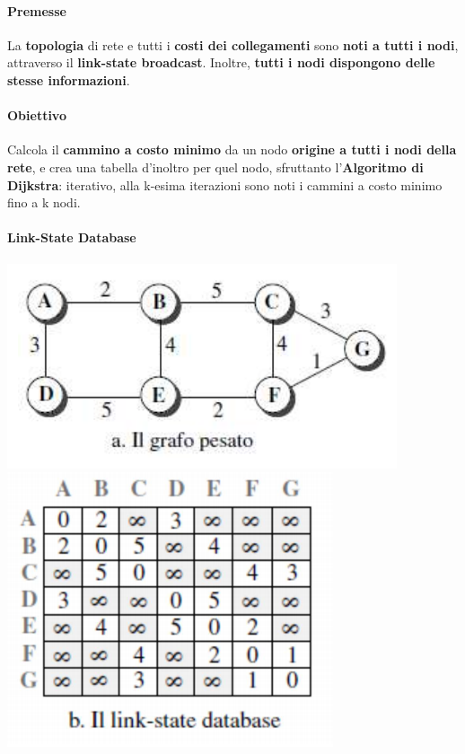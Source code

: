 \documentclass[10pt]{article}
\begin{document}
\paragraph{Premesse} La \textbf{topologia} di rete e tutti i \textbf{costi dei collegamenti} sono \textbf{noti a tutti i nodi}, attraverso il \textbf{link-state broadcast}. Inoltre, \textbf{tutti i nodi dispongono delle stesse informazioni}.
\paragraph{Obiettivo} Calcola il \textbf{cammino a costo minimo} da un nodo \textbf{origine a tutti i nodi della rete}, e crea una tabella d'inoltro per quel nodo, sfruttanto l'\textbf{Algoritmo di Dijkstra}: iterativo, alla k-esima iterazioni sono noti i cammini a costo minimo fino a k nodi.
\paragraph{Link-State Database}
\begin{center}
	\begin{multicols}{2}
		\includegraphics[scale=0.7]{linkstategraph.png}\\
		\includegraphics[scale=0.7]{linkstatedatabase.png}
	\end{multicols}
\end{center}
\end{document}
